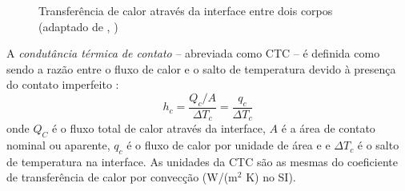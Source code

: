 \begin{figure}[h!b]
\begin{center}
\caption{Transferência de calor através da interface entre dois corpos (adaptado de \citeauthor{livro_ozisik}, \citeyear{livro_ozisik})}
\label{fig1}
\end{center}
\end{figure}

A \textit{condutância térmica de contato} -- abreviada como CTC -- é definida como sendo a razão entre o fluxo de calor e o salto de temperatura
devido à presença do contato imperfeito \citep{livro_madhusudana}:
\begin{equation}
	h_c = \frac{Q_c/A}{\Delta T_c} = \frac{q_c}{\Delta T_c} \label{eq:definicao_1}
\end{equation}
onde $Q_C$ é o fluxo total de calor através da interface, $A$ é a área de contato nominal ou aparente, $q_c$ é o fluxo de calor por unidade de área e e $\Delta T_c$ é o salto de temperatura na interface. As unidades
da CTC são as mesmas do coeficiente de transferência de calor por convecção (W/($\text{m}^2$ K) no SI).

